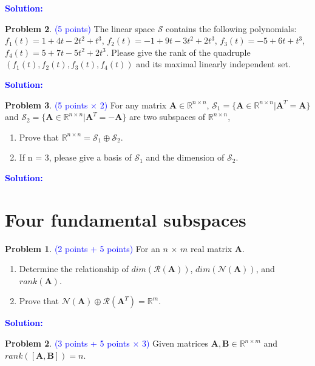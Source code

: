 \documentclass[english,onecolumn]{IEEEtran}
\newcommand{\Ab}{\mathbf{A}}
\newcommand{\Bb}{\mathbf{B}}
\newcommand{\Rbb}{\mathbb{R}}
\begin{document}
\noindent\textcolor{blue}{
	\textbf{Solution:}
}

\newpage
\noindent\textbf{Problem 2}. \textcolor{blue}{(5 points)}
The linear space $\mathcal{S}$ contains the following polynomials: $f_1(t) = 1 + 4t - 2t^2 + t^3 $, $f_2(t) = -1 + 9t - 3t^2 + 2t^3 $, $f_3(t) = -5 + 6t + t^3 $, $f_4(t) = 5 + 7t - 5t^2 + 2t^3 $. Please give the rank of the quadruple $(f_1(t),f_2(t),f_3(t),f_4(t))$ and its maximal linearly independent set.

\noindent\textcolor{blue}{
	\textbf{Solution:}
}

\newpage
\noindent\textbf{Problem 3}. \textcolor{blue}{(5 points $\times$ 2)}
For any matrix $\mathbf{A}\in\mathbb{R}^{n\times n}$, $\mathcal{S}_1 = \{\mathbf{A} \in \mathbb{R}^{n\times n}|\mathbf{A}^T=\mathbf{A}\}$ and $\mathcal{S}_2 = \{\mathbf{A} \in \mathbb{R}^{n\times n}|\mathbf{A}^T=-\mathbf{A}\}$ are two subspaces of $\mathbb{R}^{n\times n}$, 
\begin{enumerate}
	\item Prove that $ \mathbb{R}^{n\times n} =\mathcal{S}_1 \oplus \mathcal{S}_2$.
	\item If n = 3,  please give a basis of $\mathcal{S}_1$ and the dimension of $\mathcal{S}_2$.
\end{enumerate}

\noindent\textcolor{blue}{
	\textbf{Solution:}
}


\newpage
\section{Four fundamental subspaces}

\noindent\textbf{Problem 1}. \textcolor{blue}{(2 points + 5 points)}
For an $n$ $\times$ $m$ real matrix $\mathbf{A}$.
\begin{enumerate} 
\item Determine the relationship of $dim(\mathcal{R}(\mathbf{A}))$, $dim(\mathcal{N}(\mathbf{A}))$, and $rank(\mathbf{A})$. 

\item Prove that $\mathcal{N}(\mathbf{A}) \oplus \mathcal{R}(\mathbf{A}^T)=\mathbb{R}^{m}$.
\end{enumerate}

\noindent\textcolor{blue}{
	\textbf{Solution:}
}


\newpage

\noindent\textbf{Problem 2}. \textcolor{blue}{(3 points + 5 points $\times$ 3)}
Given matrices $\Ab,\Bb\in \Rbb^{n\times m}$ and $rank(\left[ \mathbf{A},\mathbf{B} \right] ) = n$.
\end{document}
